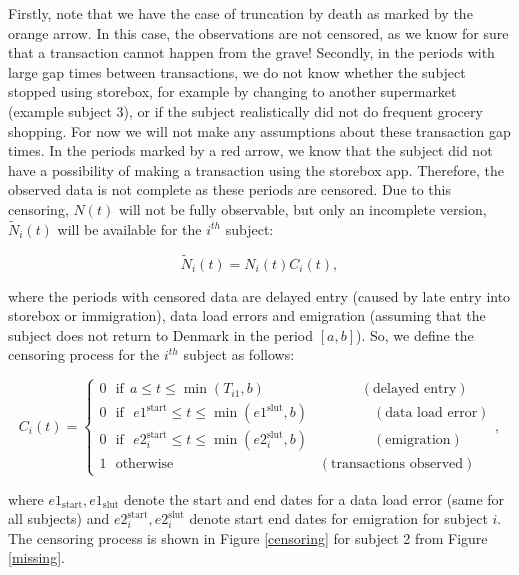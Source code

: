 \documentclass[
  11pt,
]{article}
\begin{document}
Firstly, note that we have the case of truncation by death as marked by
the orange arrow. In this case, the observations are not censored, as we
know for sure that a transaction cannot happen from the grave! Secondly,
in the periods with large gap times between transactions, we do not know
whether the subject stopped using storebox, for example by changing to
another supermarket (example subject 3), or if the subject realistically
did not do frequent grocery shopping. For now we will not make any
assumptions about these transaction gap times. In the periods marked by
a red arrow, we know that the subject did not have a possibility of
making a transaction using the storebox app. Therefore, the observed
data is not complete as these periods are censored. Due to this
censoring, \(N(t)\) will not be fully observable, but only an incomplete
version, \(\tilde{N}_i(t)\) will be available for the \(i^{th}\)
subject:

\[
\tilde{N}_i(t)=N_i(t)C_i(t),
\]

where the periods with censored data are delayed entry (caused by late
entry into storebox or immigration), data load errors and emigration
(assuming that the subject does not return to Denmark in the period
\([a,b]\)). So, we define the censoring process for the \(i^{th}\)
subject as follows:

\[
C_i(t)= \begin{cases}
0 \ \ \ \text{if} \ \ a \leq t \leq \min(T_{i1}, b) \ \ \ \ \ \ \ \ \ \ \ \ \ \ \ \ \ \ \ \ \ \ \ \ \ \ \ \ \ \ \ (\text{delayed entry}) \\
0 \ \ \ \text{if} \ \ \ e1^{\text{start}} \leq t \leq \min(e1^{\text{slut}},b) \ \ \ \ \ \ \ \ \ \ \ \ \ \ \ \ \ \ \ \ \ (\text{data load error}) \\
0 \ \ \ \text{if} \ \ \ e2_i^{\text{start}} \leq t \leq \min(e2_i^{\text{slut}},b) \ \ \ \ \ \ \ \ \ \ \ \ \ \ \ \ \ \ \ \ \ (\text{emigration}) \\
1 \ \ \ \text{otherwise} \ \ \ \ \ \ \ \ \ \ \ \ \ \ \ \ \ \ \ \ \ \ \ \ \ \ \ \ \ \ \ \ \ \ \ \ \ \ \ \ \ \ \ \ \ \ \ (\text{transactions observed})
\end{cases},
\]

where \(e1_{\text{start}}, e1_{\text{slut}}\) denote the start and end
dates for a data load error (same for all subjects) and
\(e2_i^{\text{start}}, e2_i^{\text{slut}}\) denote start end dates for
emigration for subject \(i\). The censoring process is shown in Figure
\ref{censoring} for subject 2 from Figure \ref{missing}.
\end{document}
